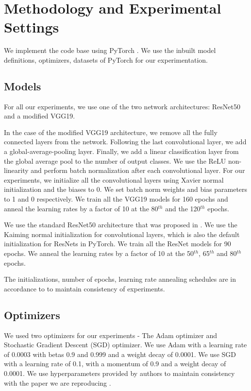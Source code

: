     
    \section{Methodology and Experimental Settings}
    \label{sec:method}
    We implement the code base using PyTorch \cite{pytorch}. We use the inbuilt model definitions, optimizers, datasets of PyTorch for our experimentation.
    
    \subsection{Models}
    \label{subsec:models}
    For all our experiments, we use one of the two network  architectures: ResNet50 and a modified VGG19. 
    
    In the case of the modified VGG19 architecture, we remove all the fully connected layers from the network. Following the last convolutional layer, we add a global-average-pooling layer. Finally, we add a linear classification layer from the global average pool to the number of output classes. We use the ReLU non-linearity and perform batch normalization after each convolutional layer. For our experiments, we initialize all the convolutional layers using Xavier normal initialization and the biases to 0. We set batch norm weights and bias parameters to 1 and 0 respectively. We train all the VGG19 models for 160 epochs and anneal the learning rates
    by a factor of 10 at the 80$^{th}$ and the 120$^{th}$ epochs. 
    
    We use the standard ResNet50 architecture that was proposed in \cite{DBLP:journals/corr/HeZRS15}. We use the Kaiming normal initialization for convolutional layers, which is also the default initialization for ResNets in PyTorch. We train all the ResNet models for 90 epochs. We anneal the learning rates by a factor of 10 at the 50$^{th}$, 65$^{th}$ and 80$^{th}$ epochs. 
    
    The initializations, number of epochs, learning rate annealing schedules are in accordance to \cite{repro_paper} to maintain consistency of experiments.
    
    \subsection{Optimizers}
    We used two optimizers for our experiments - The Adam optimizer and Stochastic Gradient Descent (SGD) optimizer. We use Adam with a learning rate of 0.0003 with betas 0.9 and 0.999 and a weight decay of 0.0001. We use SGD with a learning rate of 0.1, with a momentum of 0.9 and a weight decay of 0.0001. We use hyperparameters provided by authors to maintain consistency with the paper we are reproducing \cite{repro_paper}.
    
